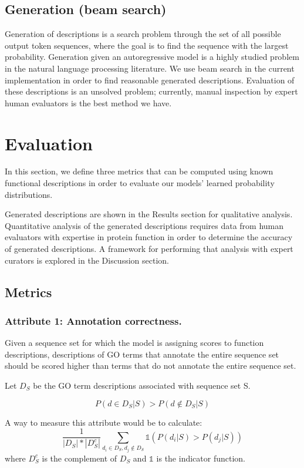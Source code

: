 \documentclass{article}
\begin{document}
    \subsection{Generation (beam search)}
    Generation of descriptions is a search problem through the set of all possible output token sequences, where the goal is to find the sequence with the largest probability. Generation given an autoregressive model is a highly studied problem in the natural language processing literature.%
    We use beam search in the current implementation in order to find reasonable generated descriptions. Evaluation of these descriptions is an unsolved problem; currently, manual inspection by expert human evaluators is the best method we have.
\section{Evaluation}
In this section, we define three metrics that can be computed using known functional descriptions in order to evaluate our models' learned probability distributions.

Generated descriptions are shown in the Results section for qualitative analysis.
Quantitative analysis of the generated descriptions requires data from human evaluators with expertise in protein function in order to determine the accuracy of generated descriptions.
A framework for performing that analysis with expert curators is explored in the Discussion section.
    \subsection{Metrics}
        \subsubsection{Attribute 1: Annotation correctness.}

        Given a sequence set for which the model is assigning scores to function descriptions, descriptions of GO terms that annotate the entire sequence set should be scored higher than terms that do not annotate the entire sequence set.

        Let $D_{S}$ be the GO term descriptions associated with sequence set S.

        \[P(d \in D_{S} | S) > P(d \notin D_{S} | S)\]

        A way to measure this attribute would be to calculate:
        \[\frac{1}{|D_{S}|*|D_{S}^{c}|}\sum_{d_i \in D_{S}, d_j \notin D_{S}} \mathds{1}(P(d_i | S) > P(d_j | S))\]
        where $D_{S}^{c}$ is the complement of $D_{S}$ and $\mathds{1}$ is the indicator function.
\end{document}
